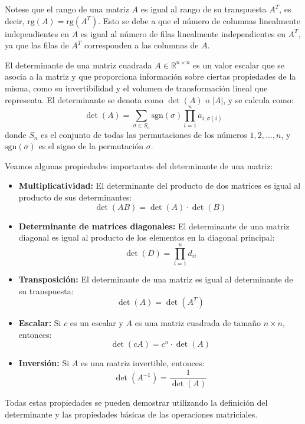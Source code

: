 \begin{observación}
    Notese que el rango de una matriz \( A \) es igual al rango de su transpuesta \( A^T \), es decir, \( \text{rg}(A) = \text{rg}(A^T) \). Esto se debe a que el número de columnas linealmente independientes en \( A \) es igual al número de filas linealmente independientes en \( A^T \), ya que las filas de \( A^T \) corresponden a las columnas de \( A \).
\end{observación}

\begin{definición}[Determinante]
    El determinante de una matriz cuadrada \( A \in \mathbb{R}^{n \times n} \) es un valor escalar que se asocia a la matriz y que proporciona información sobre ciertas propiedades de la misma, como su invertibilidad y el volumen de transformación lineal que representa. El determinante se denota como \( \det(A) \) o \( |A| \), y se calcula como:
    \[
        \det(A) = \sum_{\sigma \in S_n} \text{sgn}(\sigma) \prod_{i=1}^{n} a_{i, \sigma(i)}
    \]
    donde \( S_n \) es el conjunto de todas las permutaciones de los números \( 1, 2, \ldots, n \), y \( \text{sgn}(\sigma) \) es el signo de la permutación \( \sigma \).
\end{definición}

\begin{proposición}
    Veamos algunas propiedades importantes del determinante de una matriz:
    \begin{itemize}
        \item \textbf{Multiplicatividad:} El determinante del producto de dos matrices es igual al producto de sus determinantes:
        \[
            \det(AB) = \det(A) \cdot \det(B)
        \]
        \item \textbf{Determinante de matrices diagonales:} El determinante de una matriz diagonal es igual al producto de los elementos en la diagonal principal:
        \[
            \det(D) = \prod_{i=1}^{n} d_{ii}
        \]
        \item \textbf{Transposición:} El determinante de una matriz es igual al determinante de su transpuesta:
        \[
            \det(A) = \det(A^T)
        \]
        \item \textbf{Escalar:} Si \( c \) es un escalar y \( A \) es una matriz cuadrada de tamaño \( n \times n \), entonces:
        \[
            \det(cA) = c^n \cdot \det(A)
        \]
        \item \textbf{Inversión:} Si \( A \) es una matriz invertible, entonces:
        \[
            \det(A^{-1}) = \frac{1}{\det(A)}
        \]
    \end{itemize}
    Todas estas propiedades se pueden demostrar utilizando la definición del determinante y las propiedades básicas de las operaciones matriciales.
\end{proposición}

